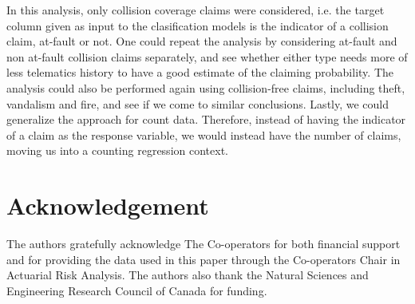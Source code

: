 \documentclass{article}
\begin{document}
In this analysis, only collision coverage claims were considered, i.e. the target column given as input to the clasification models is the indicator of a collision claim, at-fault or not. One could repeat the analysis by considering at-fault and non at-fault collision claims separately, and see whether either type needs more of less telematics history to have a good estimate of the claiming probability. The analysis could also be performed again using collision-free claims, including theft, vandalism and fire, and see if we come to similar conclusions. Lastly, we could generalize the approach for count data. Therefore, instead of having the indicator of a claim as the response variable, we would instead have the number of claims, moving us into a counting regression context.


\section*{Acknowledgement}

The authors gratefully acknowledge The Co-operators for both financial support and for providing the data used in this paper through the Co-operators Chair in Actuarial Risk Analysis. The authors also thank the Natural Sciences and Engineering Research Council of Canada for funding.



  


\end{document}
